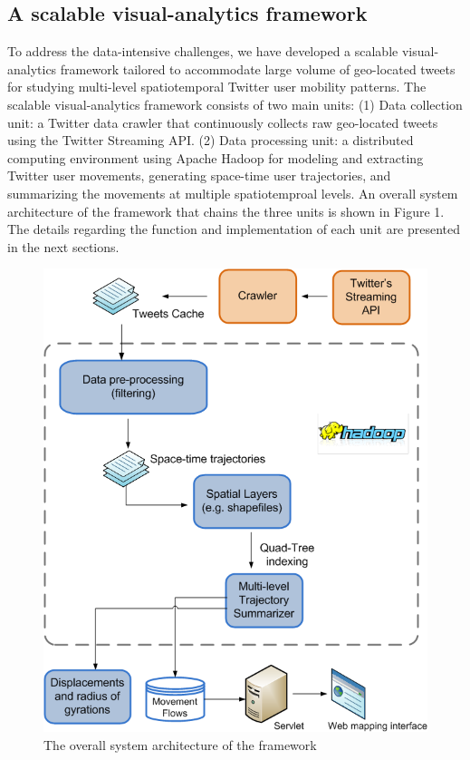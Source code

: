\documentclass[a4paper, 11pt]{article}
\begin{document}
\subsection{A scalable visual-analytics framework}
To address the data-intensive challenges, we have developed a scalable visual-analytics framework tailored to accommodate large volume of geo-located tweets for studying multi-level spatiotemporal Twitter user mobility patterns.
The scalable visual-analytics framework consists of two main units: (1) Data collection unit: a Twitter data crawler that continuously collects raw geo-located tweets using the Twitter Streaming API. (2) Data processing unit: a distributed computing environment using Apache Hadoop for modeling and extracting Twitter user movements, generating space-time user trajectories, and summarizing the movements at multiple spatiotemproal levels.
An overall system architecture of the framework that chains the three units is shown in Figure 1. The details regarding the function and implementation of each unit are presented in the next sections.

\begin{figure}[h]
\centering
\includegraphics[width=0.6\linewidth]{./figures/Overall_Architecture222}
\caption{The overall system architecture of the framework}
\label{fig:Arch}
\end{figure}
\FloatBarrier
\end{document}
